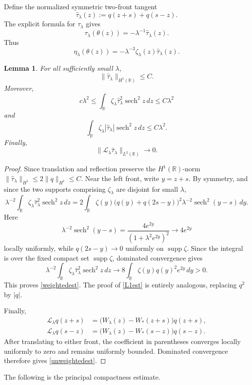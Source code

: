 \documentclass[11pt,a4paper]{article}
\DeclareMathOperator{\sech}{sech}
\numberwithin{equation}{section}
\theoremstyle{plain}
\newtheorem{lemma}[theorem]{Lemma}
\theoremstyle{remark}
\begin{document}
Define the normalized symmetric two-front tangent
\begin{equation}
\widehat{\tau}_\lambda(z)
:=
q(z+s)+q(s-z).
\end{equation}
The explicit formula for $\tau_\lambda$ gives
\begin{equation}\label{twofrontrelation}
\tau_\lambda(\theta(z))
=
-\lambda^{-1}\widehat{\tau}_\lambda(z).
\end{equation}
Thus
\begin{equation}\label{etatwofrontrelation}
\eta_\lambda(\theta(z))
=
-\lambda^{-3}\zeta_\lambda(z)\widehat{\tau}_\lambda(z).
\end{equation}

\begin{lemma}
\label{twofrontlem}
For all sufficiently small $\lambda$,
$$
\|\widehat{\tau}_\lambda\|_{H^1(\mathbb R)}
\leq
C.
$$
Moreover,
\begin{equation}\label{weightedest}
c\lambda^2
\leq
\int_{\mathbb R}
\zeta_\lambda \widehat{\tau}_\lambda^2\sech^2z\,dz
\leq
C\lambda^2
\end{equation}
and
\begin{equation}\label{L1est}
\int_{\mathbb R}
\zeta_\lambda|\widehat{\tau}_\lambda|\sech^2z\,dz
\leq
C\lambda^2.
\end{equation}
Finally,
\begin{equation}\label{unweightedest}
\|\mathscr L_\lambda \widehat{\tau}_\lambda\|_{L^2(\mathbb R)}
\longrightarrow0.
\end{equation}
\end{lemma}

\begin{proof}
Since translation and reflection preserve the $H^1(\mathbb R)$-norm $\|\widehat{\tau}_\lambda\|_{H^1}
\le
2\|q\|_{H^1}\leq C$. Near the left front, write $y=z+s$. By symmetry, and since the two supports comprising $\zeta_\lambda$ are disjoint for small $\lambda$,
$$
\lambda^{-2}\int_{\mathbb R}\zeta_\lambda \widehat{\tau}_\lambda^2\sech^2z\,dz
=
2\int_{\mathbb R}\zeta(y)
\bigl(q(y)+q(2s-y)\bigr)^2
\lambda^{-2}\sech^2(y-s)\,dy.
$$
Here
$$
\lambda^{-2}\sech^2(y-s)
=\frac{4e^{2y}}{(1+\lambda^2e^{2y})^2}
\to4e^{2y}
$$
locally uniformly, while $q(2s-y)\to0$ uniformly on $\operatorname{supp}\zeta$. Since the integral is over the fixed compact set $\operatorname{supp}\zeta$, dominated convergence gives
$$
\lambda^{-2}\int_{\mathbb R}\zeta_\lambda \widehat{\tau}_\lambda^2\sech^2z\,dz
\to
8\int_{\mathbb R}\zeta(y)q(y)^2e^{2y}\,dy>0.
$$
This proves \eqref{weightedest}. The proof of
\eqref{L1est} is entirely analogous, replacing
$q^2$ by $|q|$.

Finally,
$$
\begin{aligned}
\mathscr L_\lambda q(z+s)
&=
\bigl(W_\lambda(z)-W_*(z+s)\bigr)
q(z+s),\\
\mathscr L_\lambda q(s-z)
&=
\bigl(W_\lambda(z)-W_*(s-z)\bigr)
q(s-z).
\end{aligned}
$$
After translating to either front, the coefficient in parentheses
converges locally uniformly to zero and remains uniformly bounded.
Dominated convergence therefore gives
\eqref{unweightedest}.
\end{proof}
\noindent
The following is the principal compactness estimate.
\end{document}
